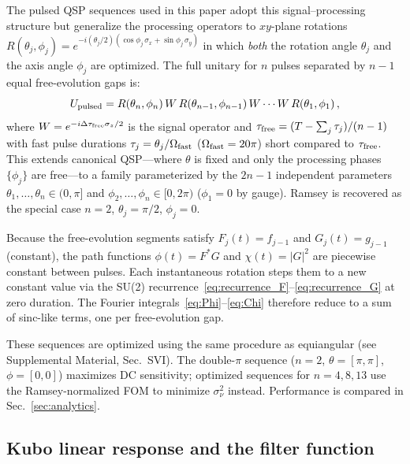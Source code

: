 \documentclass[aps,pra,twocolumn,superscriptaddress,longbibliography]{revtex4-2}
\newcommand{\be}{\begin{equation}}
\newcommand{\ee}{\end{equation}}
\begin{document}
The pulsed QSP sequences used in this paper adopt this signal--processing structure
but generalize the processing operators to $xy$-plane rotations
$R(\theta_j,\phi_j) = e^{-i(\theta_j/2)(\cos\phi_j\,\sigma_x+\sin\phi_j\,\sigma_y)}$
in which \emph{both} the rotation angle $\theta_j$ and the axis angle $\phi_j$ are
optimized.  The full unitary for $n$ pulses separated by $n-1$ equal free-evolution
gaps is:
\be
  U_{\rm pulsed} =
    R(\theta_n,\phi_n)\,W\,R(\theta_{n-1},\phi_{n-1})\,W\cdots W\,R(\theta_1,\phi_1)\,,
  \label{eq:qsp_pulsed}
\ee
where $W = e^{-i\Delta\tau_{\rm free}\sigma_z/2}$ is the signal operator and
$\tau_{\rm free} = (T - \sum_j\tau_j)/(n-1)$ with fast pulse durations
$\tau_j = \theta_j/\Omega_{\rm fast}$ ($\Omega_{\rm fast} = 20\pi$) short compared to
$\tau_{\rm free}$.  This extends canonical QSP---where $\theta$ is fixed and only the
processing phases $\{\phi_j\}$ are free---to a family parameterized by the $2n-1$
independent parameters $\theta_1,\ldots,\theta_n\in(0,\pi]$ and
$\phi_2,\ldots,\phi_n\in[0,2\pi)$ ($\phi_1=0$ by gauge).
Ramsey is recovered as the special case $n=2$, $\theta_j = \pi/2$, $\phi_j = 0$.

Because the free-evolution segments satisfy $F_j(t)=f_{j-1}$ and $G_j(t)=g_{j-1}$ (constant),
the path functions $\phi(t)=F^*G$ and $\chi(t)=|G|^2$ are piecewise constant between pulses.
Each instantaneous rotation steps them to a new constant value via the SU(2)
recurrence~\eqref{eq:recurrence_F}--\eqref{eq:recurrence_G} at zero duration.
The Fourier integrals~\eqref{eq:Phi}--\eqref{eq:Chi} therefore reduce to a sum of
sinc-like terms, one per free-evolution gap.

These sequences are optimized using the same procedure as equiangular (see Supplemental Material, Sec.~SVI).
The double-$\pi$ sequence ($n=2$, $\theta=[\pi,\pi]$, $\phi=[0,0]$) maximizes DC
sensitivity; optimized sequences for $n=4,8,13$ use the Ramsey-normalized FOM to
minimize $\sigma^2_\nu$ instead.
Performance is compared in Sec.~\ref{sec:analytics}.

\subsection{Kubo linear response and the filter function}
\label{sec:kubo}
\end{document}
